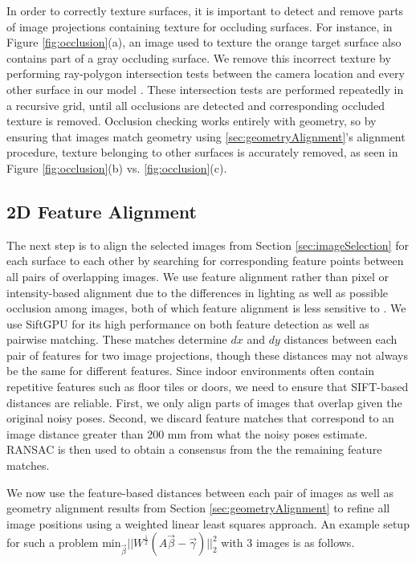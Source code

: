 \documentclass[]{spie}  %
\begin{document}
In order to correctly texture surfaces, it is important to detect and
remove parts of image projections containing texture for occluding
surfaces. For instance, in Figure \ref{fig:occlusion}(a), an image
used to texture the orange target surface also contains part of a gray
occluding surface. We remove this incorrect texture by performing
ray-polygon intersection tests between the camera location and every
other surface in our model \cite{rayintersection}. These intersection
tests are performed repeatedly in a recursive grid, until all
occlusions are detected and corresponding occluded texture is
removed. Occlusion checking works entirely with geometry, so by
ensuring that images match geometry using
\ref{sec:geometryAlignment}'s alignment procedure, texture belonging
to other surfaces is accurately removed, as seen in Figure
\ref{fig:occlusion}(b) vs. \ref{fig:occlusion}(c).

\subsection{2D Feature Alignment}
\label{sec:robustSIFTFeatureMatching}
The next step is to align the selected images from Section
\ref{sec:imageSelection} for each surface to each other by searching
for corresponding feature points between all pairs of overlapping
images. We use feature alignment rather than pixel or intensity-based
alignment due to the differences in lighting as well as possible
occlusion among images, both of which feature alignment is less
sensitive to \cite{lowe1999object, mikolajczyk2005performance,
  szeliski2006image}. We use SiftGPU \cite{siftgpu} for its high
performance on both feature detection as well as pairwise
matching. These matches determine $dx$ and $dy$ distances between each
pair of features for two image projections, though these distances may
not always be the same for different features. Since indoor
environments often contain repetitive features such as floor tiles or
doors, we need to ensure that SIFT-based distances are
reliable. First, we only align parts of images that overlap given the
original noisy poses. Second, we discard feature matches that
correspond to an image distance greater than 200 mm from what the
noisy poses estimate. RANSAC \cite{fischler1981random} is then used to
obtain a consensus from the the remaining feature matches.

We now use the feature-based distances between each pair of images as
well as geometry alignment results from Section
\ref{sec:geometryAlignment} to refine all image positions using a
weighted linear least squares approach. An example setup for such a problem $\textrm{min}_{\vec{\beta}}
||W^\frac{1}{2}(A \vec{\beta} - \vec{\gamma})||_2^2 $ with 3 images is
as follows.
\end{document}
